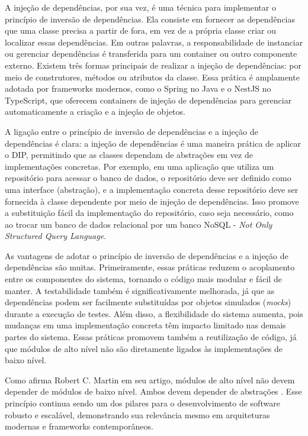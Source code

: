 A injeção de dependências, por sua vez, é uma técnica para implementar o princípio de inversão de dependências. Ela consiste em fornecer as dependências que uma classe precisa a partir de fora, em vez de a própria classe criar ou localizar essas dependências. Em outras palavras, a responsabilidade de instanciar ou gerenciar dependências é transferida para um container ou outro componente externo. Existem três formas principais de realizar a injeção de dependências: por meio de construtores, métodos ou atributos da classe. Essa prática é amplamente adotada por frameworks modernos, como o Spring no Java e o NestJS no TypeScript, que oferecem containers de injeção de dependências para gerenciar automaticamente a criação e a injeção de objetos.

A ligação entre o princípio de inversão de dependências e a injeção de dependências é clara: a injeção de dependências é uma maneira prática de aplicar o DIP, permitindo que as classes dependam de abstrações em vez de implementações concretas. Por exemplo, em uma aplicação que utiliza um repositório para acessar o banco de dados, o repositório deve ser definido como uma interface (abstração), e a implementação concreta desse repositório deve ser fornecida à classe dependente por meio de injeção de dependências. Isso promove a substituição fácil da implementação do repositório, caso seja necessário, como ao trocar um banco de dados relacional por um banco NoSQL - \textit{Not Only Structured Query Language}.

As vantagens de adotar o princípio de inversão de dependências e a injeção de dependências são muitas. Primeiramente, essas práticas reduzem o acoplamento entre os componentes do sistema, tornando o código mais modular e fácil de manter. A testabilidade também é significativamente melhorada, já que as dependências podem ser facilmente substituídas por objetos simulados (\textit{mocks}) durante a execução de testes. Além disso, a flexibilidade do sistema aumenta, pois mudanças em uma implementação concreta têm impacto limitado nas demais partes do sistema. Essas práticas promovem também a reutilização de código, já que módulos de alto nível não são diretamente ligados às implementações de baixo nível.

Como afirma Robert C. Martin em seu artigo, módulos de alto nível não devem depender de módulos de baixo nível. Ambos devem depender de abstrações \cite{martin2000design}. Esse princípio continua sendo um dos pilares para o desenvolvimento de software robusto e escalável, demonstrando sua relevância mesmo em arquiteturas modernas e frameworks contemporâneos.

